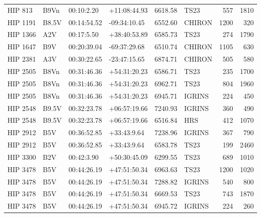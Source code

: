 \documentclass{emulateapj}
\begin{document}
\begin{longtable*}{|l|lllrlrr|}
\hline
\endlastfoot
     HIP 813 &           B9Vn &     00:10:2.20 &   +11:08:44.93 &  6618.58 &       TS23 &      557 &    1810 \\
    HIP 1191 &          B8.5V &    00:14:54.52 &   -09:34:10.45 &  6552.60 &     CHIRON &     1200 &     320 \\
    HIP 1366 &            A2V &     00:17:5.50 &   +38:40:53.89 &  6585.73 &       TS23 &      274 &    1790 \\
    HIP 1647 &            B9V &    00:20:39.04 &   -69:37:29.68 &  6510.74 &     CHIRON &     1105 &     630 \\
    HIP 2381 &            A3V &    00:30:22.65 &   -23:47:15.65 &  6874.71 &     CHIRON &      505 &     580 \\
    HIP 2505 &           B8Vn &    00:31:46.36 &   +54:31:20.23 &  6586.71 &       TS23 &      235 &    1700 \\
    HIP 2505 &           B8Vn &    00:31:46.36 &   +54:31:20.23 &  6962.71 &       TS23 &      804 &    1960 \\
    HIP 2505 &           B8Vn &    00:31:46.36 &   +54:31:20.23 &  6945.71 &     IGRINS &      224 &     450 \\
    HIP 2548 &          B9.5V &    00:32:23.78 &   +06:57:19.66 &  7240.93 &     IGRINS &      360 &     490 \\
    HIP 2548 &          B9.5V &    00:32:23.78 &   +06:57:19.66 &  6516.84 &        HRS &      412 &    1070 \\
    HIP 2912 &            B5V &    00:36:52.85 &    +33:43:9.64 &  7238.96 &     IGRINS &      367 &     790 \\
    HIP 2912 &            B5V &    00:36:52.85 &    +33:43:9.64 &  6583.78 &       TS23 &      199 &    2460 \\
    HIP 3300 &            B2V &     00:42:3.90 &   +50:30:45.09 &  6299.55 &       TS23 &      689 &    1010 \\
    HIP 3478 &            B5V &    00:44:26.19 &   +47:51:50.34 &  6963.63 &       TS23 &     1200 &    1020 \\
    HIP 3478 &            B5V &    00:44:26.19 &   +47:51:50.34 &  7288.82 &     IGRINS &      540 &     800 \\
    HIP 3478 &            B5V &    00:44:26.19 &   +47:51:50.34 &  6669.53 &       TS23 &      743 &    1870 \\
    HIP 3478 &            B5V &    00:44:26.19 &   +47:51:50.34 &  6945.72 &     IGRINS &      224 &     260 \\

\end{longtable*}
\end{document}

